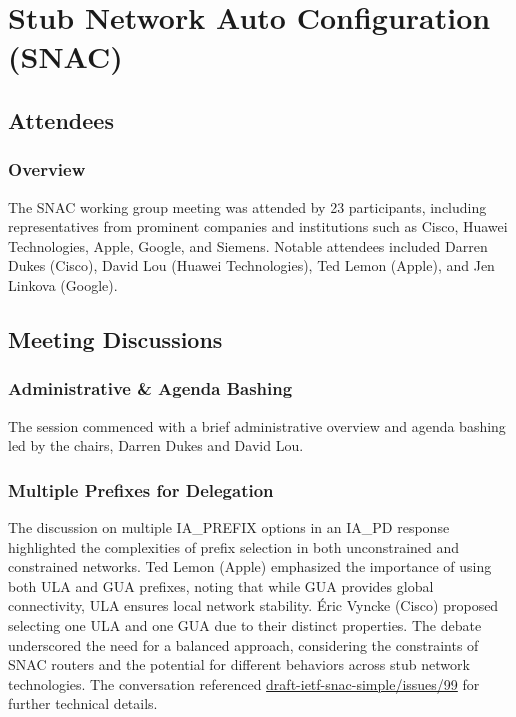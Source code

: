 \documentclass{article}
\begin{document}
\newpage

\section{Stub Network Auto Configuration (SNAC)}

\subsection{Attendees}
\subsubsection{Overview}
The SNAC working group meeting was attended by 23 participants, including representatives from prominent companies and institutions such as Cisco, Huawei Technologies, Apple, Google, and Siemens. Notable attendees included Darren Dukes (Cisco), David Lou (Huawei Technologies), Ted Lemon (Apple), and Jen Linkova (Google).

\subsection{Meeting Discussions}

\subsubsection{Administrative \& Agenda Bashing}
The session commenced with a brief administrative overview and agenda bashing led by the chairs, Darren Dukes and David Lou.

\subsubsection{Multiple Prefixes for Delegation}
The discussion on multiple IA\_PREFIX options in an IA\_PD response highlighted the complexities of prefix selection in both unconstrained and constrained networks. Ted Lemon (Apple) emphasized the importance of using both ULA and GUA prefixes, noting that while GUA provides global connectivity, ULA ensures local network stability. Éric Vyncke (Cisco) proposed selecting one ULA and one GUA due to their distinct properties. The debate underscored the need for a balanced approach, considering the constraints of SNAC routers and the potential for different behaviors across stub network technologies. The conversation referenced \href{https://github.com/ietf-wg-snac/draft-ietf-snac-simple/issues/99}{draft-ietf-snac-simple/issues/99} for further technical details.
\end{document}
